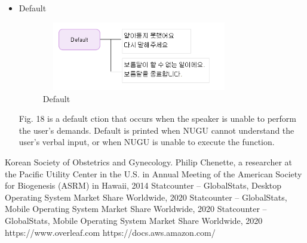 \documentclass[conference]{IEEEtran}
\begin{document}
\begin{itemize}
    \item Default
    
    \begin{figure}[ht]
    \includegraphics[width=8.5cm, height=3cm, center]{Default.PNG}
    \caption{Default}
    \label{fig : Default}
    \end{figure}
    Fig. 18 is a default ction that occurs when the speaker is unable to perform the user's demands. Default is printed when NUGU cannot understand the user's verbal input, or when NUGU is unable to execute the function.

\end{itemize}

\vspace{100cm}

\begin{thebibliography}{00}
 Korean Society of Obstetrics and Gynecology.
 Philip Chenette, a researcher at the Pacific Utility Center in the U.S. in Annual Meeting of the American Society for Biogenesis (ASRM) in Hawaii, 2014
 Statcounter – GlobalStats, Desktop Operating System Market Share Worldwide, 2020
 Statcounter – GlobalStats, Mobile Operating System Market Share Worldwide, 2020
 Statcounter – GlobalStats, Mobile Operating System Market Share Worldwide, 2020 
 https://www.overleaf.com
 https://docs.aws.amazon.com/

\end{thebibliography}
\vspace{12pt}
\color{red}
\end{document}
